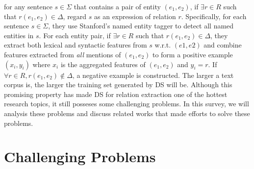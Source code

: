 \documentclass[10pt]{article} %
\theoremstyle{definition}
\theoremstyle{definition}
\begin{document}
for any sentence $s\in\Sigma$ that contains a pair of entity $(e_1,e_2)$, if $\exists{}r\in{}R$ such that $r(e_1,e_2)\in\Delta$, regard $s$ as an expression of relation $r$. 
Specifically, for each sentence $s\in\Sigma$, they use Stanford's named entity tagger to detect all named entities in $s$. 
For each entity pair, if $\exists{}r\in{}R$ such that $r(e_1,e_2)\in\Delta$, they extract both lexical and syntactic features from $s$ w.r.t. $(e1,e2)$ and combine features extracted from \emph{all} mentions of $(e_1,e_2)$ 
to form a positive example $(x_i,y_i)$ where $x_i$ is the aggregated features of $(e_1,e_2)$ and $y_i=r$. 
If $\forall{}r\in{}R,r(e_1,e_2)\notin\Delta$, a negative example is constructed. 
The larger a text corpus is, the larger the training set generated by DS will be. 
Although this promising property has made DS for relation extraction one of the hottest research topics, it still posseses some challenging problems. 
In this survey, we will analysis these problems and discuss related works that made efforts to solve these problems. 



\section{Challenging Problems}
\end{document}
